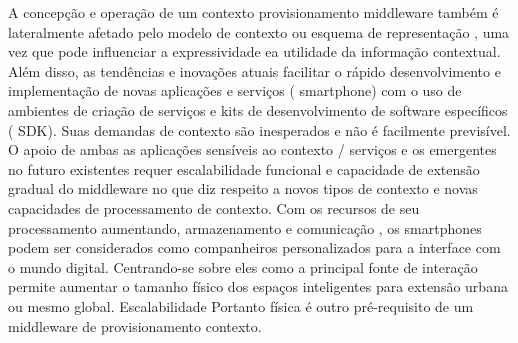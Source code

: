 \documentclass[12pt]{article} %
\begin{document}
A concepção e operação de um contexto provisionamento middleware também é lateralmente afetado pelo modelo de contexto ou esquema de representação , uma vez que pode influenciar a expressividade ea utilidade da informação contextual. Além disso, as tendências e inovações atuais facilitar o rápido desenvolvimento e implementação de novas aplicações e serviços ( smartphone) com o uso de ambientes de criação de serviços e kits de desenvolvimento de software específicos ( SDK). Suas demandas de contexto são inesperados e não é facilmente previsível. O apoio de ambas as aplicações sensíveis ao contexto / serviços e os emergentes no futuro existentes requer escalabilidade funcional e capacidade de extensão gradual do middleware no que diz respeito a novos tipos de contexto e novas capacidades de processamento de contexto. Com os recursos de seu processamento aumentando, armazenamento e comunicação , os smartphones podem ser considerados como companheiros personalizados para a interface com o mundo digital. Centrando-se sobre eles como a principal fonte de interação permite aumentar o tamanho físico dos espaços inteligentes para extensão urbana ou mesmo global. Escalabilidade Portanto física é outro pré-requisito de um middleware de provisionamento contexto.

\end{document}
